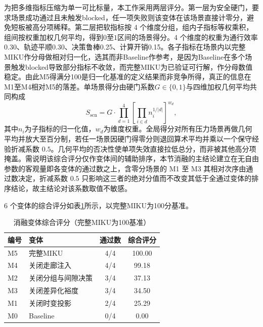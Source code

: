 \documentclass[a4paper,11pt]{ctexart}
\theoremstyle{definition}
\begin{document}
为把多维指标压缩为单一可比标量，本工作采用两层评分。第一层为安全硬门，要求场景成功通过且未触发blocked，任一项失败则该变体在该场景直接计零分，避免短板被高分项稀释。第二层把软指标按 4 个维度分组，组内子指标等权乘积，组间按权重加权几何平均，得到$0$至$1$区间的场景得分。4 个维度的权重为通行效率0.30、轨迹平顺0.30、决策鲁棒0.25、计算开销0.15。各子指标在场景内以完整MIKU作分母做相对归一化，选其而非Baseline作参考，是因为Baseline在多个场景触发blocked导致部分指标不收敛，而完整MIKU为已验证可行解，作分母数值稳定。由此M5得满分100是归一化基准的定义结果而非竞争所得，真正的信息在M1至M4相对M5的落差。单场景得分由硬门系数$G \in \{0, 1\}$与四维加权几何平均共同构成
\begin{equation}
S_{\mathrm{scn}} = G \cdot \prod_{d=1}^{4} \left[ \prod_{i \in d} n_i^{1/|d|} \right]^{w_d},
\label{eq:exp_score_scn}
\end{equation}
其中$n_i$为子指标的归一化值，$w_d$为维度权重。全局得分对所有压力场景再做几何平均并放大至百分制，若任一场景因硬门得零分则退回算术平均并乘以一个保守经验折减系数 $0.5$。几何平均的否决性使单项失效直接拉低总分，而非被其他高分项掩盖。需说明该综合评分仅作变体间的辅助排序，本节消融的主结论建立在无自由参数的客观量即各变体的通过数之上，含零分场景的 M1 至 M3 其相对次序由通过数决定，折减系数 $0.5$ 只影响这三者的绝对分值而不改变其低于全通过变体的排序结论，故主结论对该系数取值不敏感。

6 个变体的综合评分如表\ref{tab:exp_ablation_score}所示，以完整MIKU为100分基准。

\begin{table}[htbp]
\centering
\caption{消融变体综合评分（完整MIKU为100基准）}
\label{tab:exp_ablation_score}
\small
\begin{tabular}{llcc}
\toprule
\textbf{编号} & \textbf{变体} & \textbf{通过数} & \textbf{综合评分} \\
\midrule
M5 & 完整MIKU             & 4/4 & 100.00 \\
M4 & 关闭走廊注入         & 4/4 & 99.18 \\
M2 & 关闭分组与间隙决策   & 3/4 & 37.13 \\
M3 & 关闭差异化裕度       & 3/4 & 34.50 \\
M1 & 关闭时变投影         & 2/4 & 25.29 \\
M0 & Baseline             & 0/4 & 0.00 \\
\bottomrule
\end{tabular}
\end{table}
\end{document}
